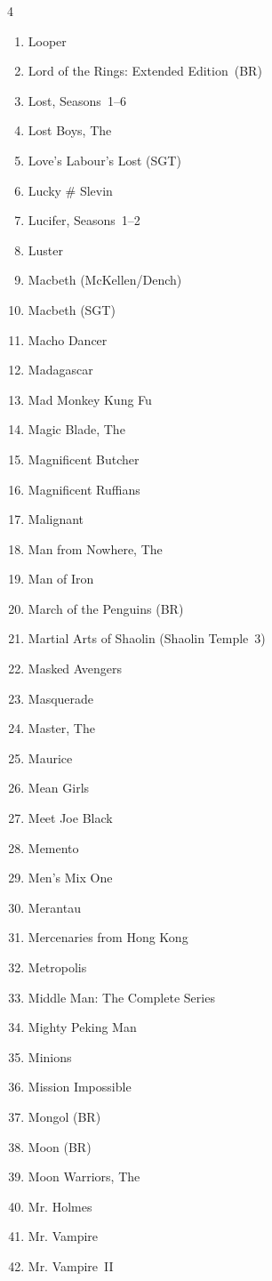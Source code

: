 \documentclass{article}
\begin{document}
\begin{multicols}{4}
\begin{enumerate}
\item Looper
\item Lord of the Rings: Extended Edition~(BR)
\item Lost, Seasons~1--6
\item Lost Boys, The
\item Love's Labour's Lost (SGT)
\item Lucky \# Slevin
\item Lucifer, Seasons~1--2
\item Luster
\item Macbeth (McKellen/Dench)
\item Macbeth (SGT)
\item Macho Dancer
\item Madagascar
\item Mad Monkey Kung Fu
\item Magic Blade, The
\item Magnificent Butcher
\item Magnificent Ruffians
\item Malignant
\item Man from Nowhere, The
\item Man of Iron
\item March of the Penguins (BR)
\item Martial Arts of Shaolin (Shaolin Temple~3)
\item Masked Avengers
\item Masquerade
\item Master, The
\item Maurice
\item Mean Girls
\item Meet Joe Black
\item Memento
\item Men's Mix One
\item Merantau
\item Mercenaries from Hong Kong
\item Metropolis
\item Middle Man: The Complete Series
\item Mighty Peking Man
\item Minions
\item Mission Impossible
\item Mongol (BR)
\item Moon (BR)
\item Moon Warriors, The
\item Mr. Holmes
\item Mr. Vampire
\item Mr. Vampire~II

\end{enumerate}
\end{multicols}
\end{document}
